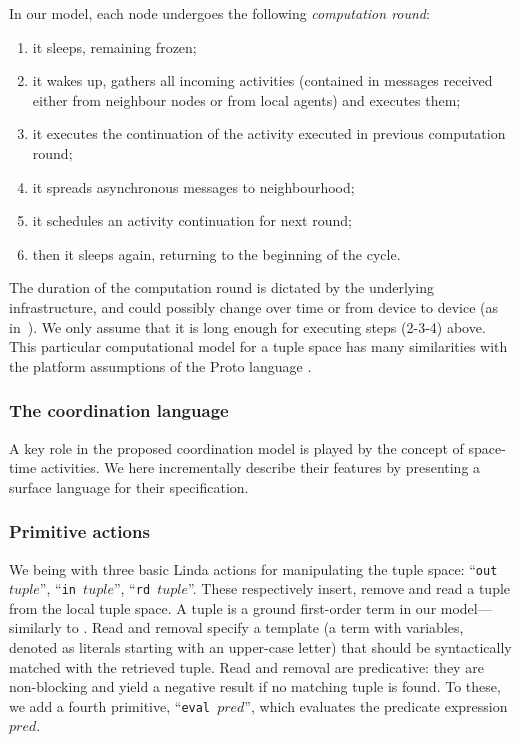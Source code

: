 \documentclass[12pt,a4paper,twoside,openright]{book}
\begin{document}
In our model, each node undergoes the following \emph{computation round}:
\begin{enumerate}
 \item it sleeps, remaining frozen;
 \item it wakes up, gathers all incoming activities (contained in messages received either from neighbour nodes or from local agents) and executes them;
 \item it executes the continuation of the activity executed in previous computation round;
 \item it spreads asynchronous messages to neighbourhood;
 \item it schedules an activity continuation for next round;
 \item then it sleeps again, returning to the beginning of the cycle.
\end{enumerate}
%
The duration of the computation round is dictated by the underlying infrastructure, and could possibly change over time or from device to device (as in~\cite{ProtoTime}).
%
We only assume that it is long enough for executing steps (2-3-4) above.
%
This particular computational model for a tuple space has many similarities with the platform assumptions of the Proto language \cite{proto,spatialcomputing-sac11}.

\subsubsection{The coordination language}

A key role in the proposed coordination model is played by the concept of space-time activities.
%
We here incrementally describe their features by presenting a surface language for their specification.

\subsubsection*{Primitive actions}

We being with three basic Linda actions for manipulating the tuple space: ``\texttt{out $tuple$}'', ``\texttt{in $tuple$}'', ``\texttt{rd $tuple$}''. 
%
These respectively insert, remove and read a tuple from the local tuple space.
%
A tuple is a ground first-order term in our model---similarly to \cite{tucson-aamas99}.
%
Read and removal specify a template (a term with variables, denoted as literals starting with an upper-case letter) that should be syntactically matched with the retrieved tuple. 
%
Read and removal are predicative: they are non-blocking and yield a negative result if no matching tuple is found. 
%
To these, we add a fourth primitive, ``\texttt{eval $pred$}'', which evaluates the predicate expression $pred$.
\end{document}
